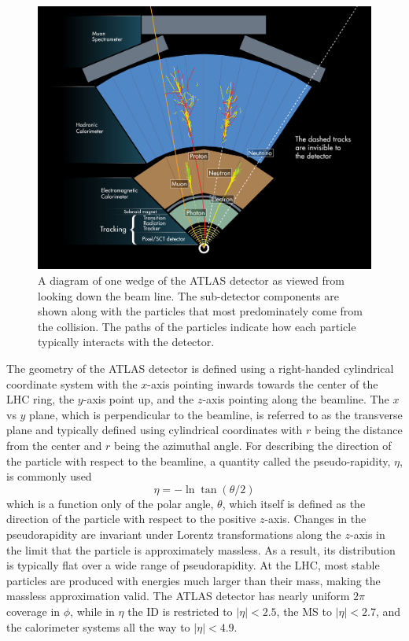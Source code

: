 \begin{figure}[ht!]
\centering
\includegraphics[width=.9\textwidth]{figures/atlas/wedge.jpg}
\caption{A diagram of one wedge of the ATLAS detector
as viewed from looking down the beam line. 
The sub-detector components are shown along with the 
particles that most predominately come from the collision.
The paths of the particles indicate how each particle typically 
interacts with the detector.}
\label{fig:atlas_wedge}
\end{figure}

The geometry of the ATLAS detector is defined using a 
right-handed cylindrical coordinate system with the $x$-axis
pointing inwards towards the center of the LHC ring, the $y$-axis point
up, and the $z$-axis pointing along the beamline.
The $x$ vs $y$ plane, which is perpendicular to the beamline,
is referred to as the transverse plane and typically 
defined using cylindrical coordinates with $r$ being the distance
from the center and $r$ being the azimuthal angle.
For describing the direction of the particle with respect 
to the beamline, a quantity called the pseudo-rapidity, $\eta$, is commonly
used
\begin{equation}
\eta = -\ln \tan (\theta/2) 
\label{eq:pseudorapidity}
\end{equation}
which is a function only of the polar angle, $\theta$, which 
itself is defined
as the direction of the particle with respect to the positive $z$-axis.
Changes in the pseudorapidity are 
invariant under Lorentz transformations along
the $z$-axis in the limit that the particle is approximately massless. 
As a result, its distribution is typically flat over
a wide range of pseudorapidity. At the LHC, most stable particles 
are produced with energies much larger than their mass, making the 
massless approximation valid.
The ATLAS detector has nearly uniform $2\pi$ coverage in $\phi$,
while in $\eta$ the ID is restricted to $|\eta| < 2.5$,
the MS to $|\eta| < 2.7$, and the calorimeter systems all the way
to $|\eta| < 4.9$.

